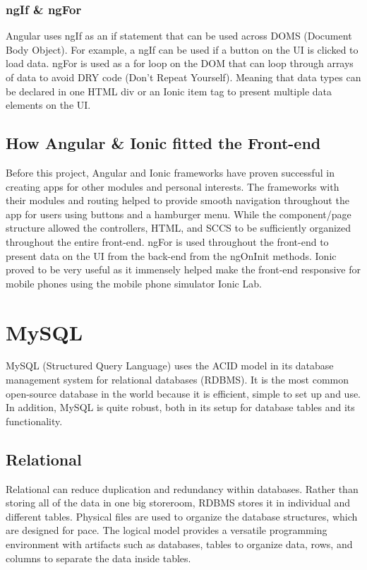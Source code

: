 \subsubsection{ngIf \& ngFor}
Angular uses ngIf as an if statement that can be used across DOMS (Document Body Object). For example, a ngIf can be used if a button on the UI is clicked to load data. ngFor is used as a for loop on the DOM that can loop through arrays of data to avoid DRY code (Don't Repeat Yourself). Meaning that data types can be declared in one HTML div or an Ionic item tag to present multiple data elements on the UI.

\subsection{How Angular \& Ionic fitted the Front-end}
Before this project, Angular and Ionic frameworks have proven successful in creating apps for other modules and personal interests. The frameworks with their modules and routing helped to provide smooth navigation throughout the app for users using buttons and a hamburger menu. While the component/page structure allowed the controllers, HTML, and SCCS to be sufficiently organized throughout the entire front-end. ngFor is used throughout the front-end to present data on the UI from the back-end from the ngOnInit methods.
Ionic proved to be very useful as it immensely helped make the front-end responsive for mobile phones using the mobile phone simulator Ionic Lab.

\section{MySQL}
MySQL (Structured Query Language) uses the ACID model in its database management system for relational databases (RDBMS). It is the most common open-source database in the world because it is efficient, simple to set up and use. \cite{ref17}  In addition, MySQL is quite robust, both in its setup for database tables and its functionality.
 
\subsection{Relational}
Relational can reduce duplication and redundancy within databases. Rather than storing all of the data in one big storeroom, RDBMS stores it in individual and different tables. Physical files are used to organize the database structures, which are designed for pace. The logical model provides a versatile programming environment with artifacts such as databases, tables to organize data, rows, and columns to separate the data inside tables. \cite{ref18}
 
